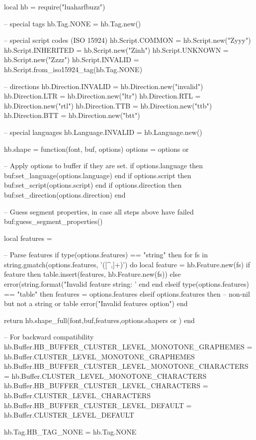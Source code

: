 \begin{typing}
local hb = require("luaharfbuzz")

-- special tags
hb.Tag.NONE = hb.Tag.new()

-- special script codes (ISO 15924)
hb.Script.COMMON    = hb.Script.new("Zyyy")
hb.Script.INHERITED = hb.Script.new("Zinh")
hb.Script.UNKNOWN   = hb.Script.new("Zzzz")
hb.Script.INVALID   = hb.Script.from_iso15924_tag(hb.Tag.NONE)

-- directions
hb.Direction.INVALID = hb.Direction.new("invalid")
hb.Direction.LTR = hb.Direction.new("ltr")
hb.Direction.RTL = hb.Direction.new("rtl")
hb.Direction.TTB = hb.Direction.new("ttb")
hb.Direction.BTT = hb.Direction.new("btt")

-- special languages
hb.Language.INVALID = hb.Language.new()

hb.shape = function(font, buf, options)
  options = options or { }

  -- Apply options to buffer if they are set.
  if options.language then buf:set_language(options.language) end
  if options.script then buf:set_script(options.script) end
  if options.direction then buf:set_direction(options.direction) end

  -- Guess segment properties, in case all steps above have failed
  buf:guess_segment_properties()

  local features = {}

  -- Parse features
  if type(options.features) == "string" then
    for fs in string.gmatch(options.features, '([^,]+)') do
      local feature = hb.Feature.new(fs)
      if feature then
        table.insert(features, hb.Feature.new(fs))
      else
        error(string.format("Invalid feature string: '%
      end
    end
  elseif type(options.features) == "table" then
    features = options.features
  elseif options.features then -- non-nil but not a string or table
    error("Invalid features option")
  end

  return hb.shape_full(font,buf,features,options.shapers or {})
end

-- For backward compatibility
hb.Buffer.HB_BUFFER_CLUSTER_LEVEL_MONOTONE_GRAPHEMES  = hb.Buffer.CLUSTER_LEVEL_MONOTONE_GRAPHEMES
hb.Buffer.HB_BUFFER_CLUSTER_LEVEL_MONOTONE_CHARACTERS = hb.Buffer.CLUSTER_LEVEL_MONOTONE_CHARACTERS
hb.Buffer.HB_BUFFER_CLUSTER_LEVEL_CHARACTERS          = hb.Buffer.CLUSTER_LEVEL_CHARACTERS
hb.Buffer.HB_BUFFER_CLUSTER_LEVEL_DEFAULT             = hb.Buffer.CLUSTER_LEVEL_DEFAULT

hb.Tag.HB_TAG_NONE = hb.Tag.NONE


\end{typing}
